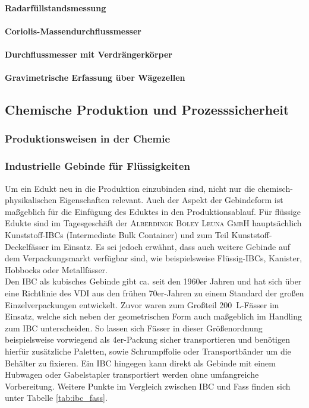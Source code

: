 \paragraph*{Radarfüllstandsmessung}
\paragraph*{Coriolis-Massendurchflussmesser}
\paragraph*{Durchflussmesser mit Verdrängerkörper}
\paragraph*{Gravimetrische Erfassung über Wägezellen}

\subsection{Chemische Produktion und Prozesssicherheit}
\subsubsection{Produktionsweisen in der Chemie}
\subsubsection{Industrielle Gebinde für Flüssigkeiten}
Um ein Edukt neu in die Produktion einzubinden sind, nicht nur die chemisch-physikalischen Eigenschaften relevant. Auch der Aspekt der Gebindeform ist maßgeblich für die Einfügung des Eduktes in den Produktionsablauf. Für flüssige Edukte sind im Tagesgeschäft der \textsc{Alberdingk Boley Leuna GmbH} hauptsächlich Kunststoff-IBCs (Intermediate Bulk Container) und zum Teil Kunststoff-Deckelfässer im Einsatz. Es sei jedoch erwähnt, dass auch weitere Gebinde auf dem Verpackungsmarkt verfügbar sind, wie beispielsweise Flüssig-IBCs, Kanister, Hobbocks oder Metallfässer.\\
Den IBC als kubisches Gebinde gibt ca. seit den 1960er Jahren  und hat sich über eine Richtlinie des VDI aus den frühen 70er-Jahren zu einem Standard der großen Einzelverpackungen entwickelt. Zuvor waren zum Großteil \SI{200}{\liter}-Fässer im Einsatz, welche sich neben der geometrischen Form auch maßgeblich im Handling zum IBC unterscheiden. \cite{neueverpackung.01.02.2022}
So lassen sich Fässer in dieser Größenordnung beispielsweise vorwiegend als 4er-Packung sicher transportieren und benötigen hierfür zusätzliche Paletten, sowie Schrumpffolie oder Transportbänder um die Behälter zu fixieren. Ein IBC hingegen kann direkt als Gebinde mit einem Hubwagen oder Gabelstapler transportiert werden ohne umfangreiche Vorbereitung. Weitere Punkte im Vergleich zwischen IBC und Fass finden sich unter Tabelle \ref{tab:ibc_fass}.

